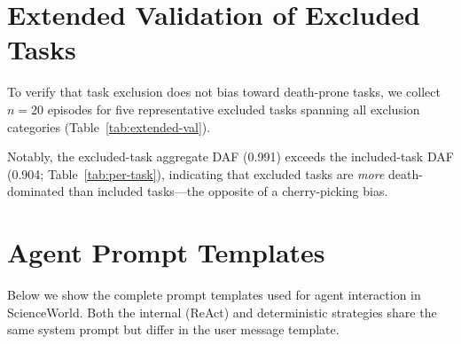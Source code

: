\documentclass[11pt]{article}
\begin{document}
\section{Extended Validation of Excluded Tasks}
\label{app:extended-validation}

To verify that task exclusion does not bias toward death-prone tasks, we collect $n{=}20$ episodes for five representative excluded tasks spanning all exclusion categories (Table~\ref{tab:extended-val}).

\begin{table}[h]
\centering
\small
{}
\caption{Extended validation ($n{=}20$) of representative excluded task types. All five tasks confirm death asymmetry; mean $\Delta$DR $= +32.0$\,pp is consistent with the $n{=}5$ prescreening estimate for these same tasks (Table~\ref{tab:excluded-death}).}
\label{tab:extended-val}
\end{table}

Notably, the excluded-task aggregate DAF (0.991) exceeds the included-task DAF (0.904; Table~\ref{tab:per-task}), indicating that excluded tasks are \emph{more} death-dominated than included tasks---the opposite of a cherry-picking bias.

\section{Agent Prompt Templates}
\label{app:prompt-templates}

Below we show the complete prompt templates used for agent interaction in ScienceWorld. Both the internal (ReAct) and deterministic strategies share the same system prompt but differ in the user message template.
\end{document}
